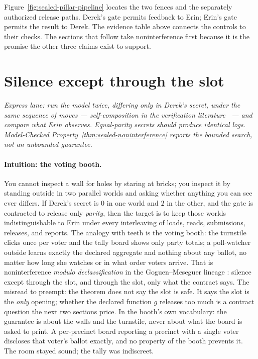 \documentclass[11pt,a4paper]{article}
\theoremstyle{definition}
\begin{document}
Figure~\ref{fig:sealed-pillar-pipeline} locates the two fences and the
separately authorized release paths. Derek's gate permits feedback to Erin;
Erin's gate permits the result to Derek. The evidence table above connects
the controls to their checks. The sections that follow take noninterference
first because it is the promise the other three claims exist to support.



\ifdefined\pdreflectionplate{}\fi
\section{Silence except through the slot}\label{sec:sealed-noninterference}

\noindent\emph{Express lane: run the model twice, differing only in Derek's
secret, under the same sequence of moves --- self-composition in the
verification literature~ --- and compare what Erin observes.
Equal-parity secrets should produce identical logs.
Model-Checked Property~\ref{thm:sealed-noninterference} reports the bounded
search, not an unbounded guarantee.}

\paragraph{Intuition: the voting booth.} %
You cannot inspect a wall for holes by staring at bricks; you inspect it by
standing outside in two parallel worlds and asking whether anything you can see
ever differs. If Derek's secret is $0$ in one world and $2$ in the other, and
the gate is contracted to release only \emph{parity}, then the target is to keep
those worlds indistinguishable to Erin under every interleaving of
loads, reads, submissions, releases, and reports. The analogy with teeth is the
voting booth: the turnstile clicks once per voter and the tally board shows only
party totals; a poll-watcher outside learns exactly the declared aggregate and
nothing about any ballot, no matter how long she watches or in what order
voters arrive. That is noninterference \emph{modulo declassification} in the
Goguen--Meseguer lineage : silence
except through the slot, and through the slot, only what the contract says. The
misread to preempt: the theorem does not say the slot is safe. It says the slot
is the \emph{only} opening; whether the declared function $g$ releases too much
is a contract question the next two sections price. In the booth's own
vocabulary: the guarantee is about the walls and the turnstile, never about what
the board is asked to print. A per-precinct board reporting a precinct with a
single voter discloses that voter's ballot exactly, and no property of the
booth prevents it. The room stayed sound; the tally was indiscreet.
\end{document}
